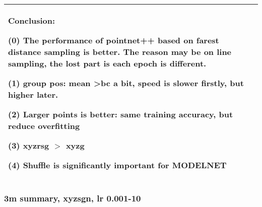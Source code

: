 \documentclass[,table,dvipsnames]{article}
\begin{document}
\begin{tabular}{|p{1.5cm}|p{1.5cm}|p{1cm}|p{1.5cm}|p{1.5cm}|p{1.5cm}|p{5cm}| }
	\multicolumn{7}{|p{16cm}|}{ Conclusion:\par	
		(0) The performance of pointnet++ based on farest distance sampling is better. The reason may be on line sampling, the lost part is each epoch is different.\par 
		(1) group pos: mean \textgreater bc a bit, speed is slower firstly, but higher later.\par
		(2) Larger points is better: same training accuracy, but reduce overfitting\par 
		(3) xyzrsg $>$ xyzg\par 
		(4) Shuffle is significantly important for MODELNET } \\
	\hline	
\end{tabular}

\subsubsection{3m summary, xyzsgn, lr 0.001-10}
\end{document}
